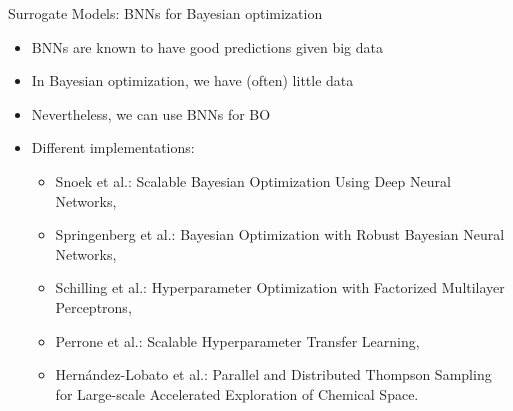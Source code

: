 \begin{frame}[c]{Surrogate Models: BNNs for Bayesian optimization}

\begin{itemize}
	\item BNNs are known to have good predictions given big data \pause
	\item In Bayesian optimization, we have (often) little data \pause
	\item Nevertheless, we can use BNNs for BO \pause
	\bigskip
	\item Different implementations:
	\begin{itemize}
	    \item Snoek et al.: Scalable Bayesian Optimization Using Deep Neural Networks, \pause
	    \item Springenberg et al.: Bayesian Optimization with Robust Bayesian Neural Networks, \pause
        \item Schilling et al.: Hyperparameter Optimization with Factorized Multilayer Perceptrons, \pause
        \item Perrone et al.: Scalable Hyperparameter Transfer Learning, \pause
        \item Hern\'andez-Lobato et al.: Parallel and Distributed Thompson Sampling for Large-scale Accelerated Exploration of Chemical Space.

	\end{itemize}
\end{itemize}

\end{frame}

